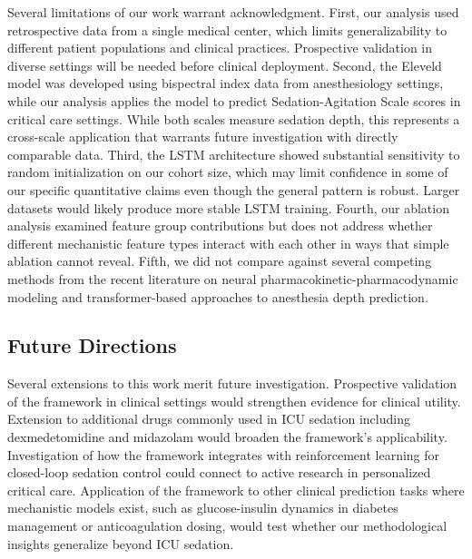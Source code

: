 \documentclass[11pt,a4paper]{article}
\begin{document}
Several limitations of our work warrant acknowledgment. First, our analysis used retrospective data from a single medical center, which limits generalizability to different patient populations and clinical practices. Prospective validation in diverse settings will be needed before clinical deployment. Second, the Eleveld model was developed using bispectral index data from anesthesiology settings, while our analysis applies the model to predict Sedation-Agitation Scale scores in critical care settings. While both scales measure sedation depth, this represents a cross-scale application that warrants future investigation with directly comparable data. Third, the LSTM architecture showed substantial sensitivity to random initialization on our cohort size, which may limit confidence in some of our specific quantitative claims even though the general pattern is robust. Larger datasets would likely produce more stable LSTM training. Fourth, our ablation analysis examined feature group contributions but does not address whether different mechanistic feature types interact with each other in ways that simple ablation cannot reveal. Fifth, we did not compare against several competing methods from the recent literature on neural pharmacokinetic-pharmacodynamic modeling and transformer-based approaches to anesthesia depth prediction.

\subsection{Future Directions}

Several extensions to this work merit future investigation. Prospective validation of the framework in clinical settings would strengthen evidence for clinical utility. Extension to additional drugs commonly used in ICU sedation including dexmedetomidine and midazolam would broaden the framework's applicability. Investigation of how the framework integrates with reinforcement learning for closed-loop sedation control could connect to active research in personalized critical care. Application of the framework to other clinical prediction tasks where mechanistic models exist, such as glucose-insulin dynamics in diabetes management or anticoagulation dosing, would test whether our methodological insights generalize beyond ICU sedation.

\end{document}
